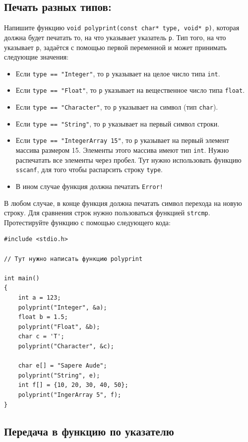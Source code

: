 \documentclass[10pt]{article}
\begin{document}
\subsection{Печать разных типов:}
Напишите функцию \texttt{void polyprint(const char* type, void* p)}, которая должна будет печатать то, на что указывает указатель \texttt{p}. Тип того, на что указывает \texttt{p}, задаётся с помощью первой переменной и может принимать следующие значения:
\begin{itemize}
\item Если \texttt{type == "Integer"}, то \texttt{p} указывает на целое число типа \texttt{int}.
\item Если \texttt{type == "Float"}, то \texttt{p} указывает на вещественное число типа \texttt{float}.
\item Если \texttt{type == "Character"}, то \texttt{p} указывает на символ (тип \texttt{char}).
\item Если \texttt{type == "String"}, то \texttt{p} указывает на первый символ строки.
\item Если \texttt{type == "IntegerArray 15"}, то \texttt{p} указывает на первый элемент массива размером 15. Элементы этого массива имеют тип \texttt{int}. Нужно распечатать все элементы через пробел. Тут нужно использовать функцию \texttt{sscanf}, для того чтобы распарсить строку \texttt{type}.
\item В ином случае функция должна печатать \texttt{Error!}
\end{itemize}
В любом случае, в конце функция должна печатать символ перехода на новую строку. Для сравнения строк нужно пользоваться функцией \texttt{strcmp}. Протестируйте функцию с помощью следующего кода:

\begin{lstlisting}
#include <stdio.h>

// Тут нужно написать функцию polyprint

int main() 
{
    int a = 123;
    polyprint("Integer", &a);
    float b = 1.5;
    polyprint("Float", &b);
    char c = 'T';
    polyprint("Character", &c);
    
    char e[] = "Sapere Aude";
    polyprint("String", e);
    int f[] = {10, 20, 30, 40, 50};
    polyprint("IngerArray 5", f);
}
\end{lstlisting}




\subsection{Передача в функцию по указателю}
\end{document}
